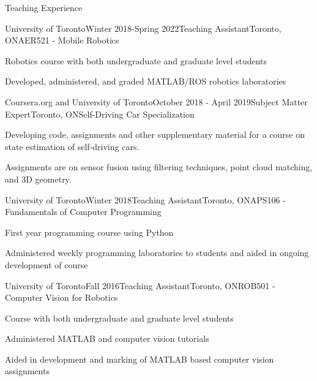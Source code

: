 \documentclass[usenames, dvipsnames]{resume} %
\begin{document}

\begin{rSection}{Teaching Experience}

\begin{rTeachSubsection}{University of Toronto}{Winter 2018-Spring 2022}{Teaching Assistant}{Toronto, ON}{AER521 - Mobile Robotics}
	\item Robotics course with both undergraduate and graduate level students
	\item Developed, administered, and graded MATLAB/ROS robotics laboratories
\end{rTeachSubsection}

\begin{rTeachSubsection}{Coursera.org and University of Toronto}{October 2018 - April 2019}{Subject Matter Expert}{Toronto, ON}{Self-Driving Car Specialization}
	\item Developing code, assignments and other supplementary material for a course on state estimation of self-driving cars.
	\item Assignments are on sensor fusion using filtering techniques, point cloud matching, and 3D geometry.
\end{rTeachSubsection}


\begin{rTeachSubsection}{University of Toronto}{Winter 2018}{Teaching Assistant}{Toronto, ON}{APS106 - Fundamentals of Computer Programming}
	\item First year programming course using Python
	\item Administered weekly programming laboratories to students and aided in ongoing development of course
\end{rTeachSubsection}
	
	
\begin{rTeachSubsection}{University of Toronto}{Fall 2016}{Teaching Assistant}{Toronto, ON}{ROB501 - Computer Vision for Robotics}
	\item Course with both undergraduate and graduate level students
	\item Administered MATLAB and computer vision tutorials
	\item Aided in development and marking of MATLAB based computer vision assignments
\end{rTeachSubsection}


\end{rSection}
\end{document}
